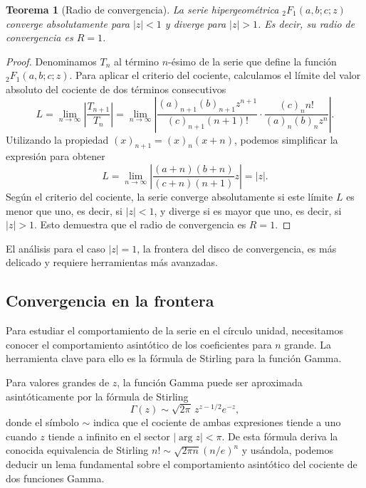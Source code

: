 \documentclass[12pt,a4paper]{book}
\newtheorem{theorem}{Teorema}
\begin{document}
\begin{theorem}[Radio de convergencia]
La serie hipergeométrica ${}_{2}F_{1}(a,b;c;z)$ converge absolutamente para $|z|<1$ y diverge para $|z|>1$. Es decir, su radio de convergencia es $R=1$.
\end{theorem}

\begin{proof}
Denominamos $T_n$ al término $n$-ésimo de la serie que define la función ${}_{2}F_{1}(a,b;c;z)$. Para aplicar el criterio del cociente, calculamos el límite del valor absoluto del cociente de dos términos consecutivos
\[
L = \lim_{n \to \infty} \left| \frac{T_{n+1}}{T_n} \right| = \lim_{n \to \infty} \left| \frac{(a)_{n+1} (b)_{n+1} z^{n+1}}{(c)_{n+1} (n+1)!} \cdot \frac{(c)_n n!}{(a)_n (b)_n z^n} \right|.
\]
Utilizando la propiedad $(x)_{n+1} = (x)_n (x+n)$, podemos simplificar la expresión para obtener
\[
L = \lim_{n \to \infty} \left| \frac{(a+n)(b+n)}{(c+n)(n+1)} z \right| = |z|.
\]
Según el criterio del cociente, la serie converge absolutamente si este límite $L$ es menor que uno, es decir, si $|z|<1$, y diverge si es mayor que uno, es decir, si $|z|>1$. Esto demuestra que el radio de convergencia es $R=1$.
\end{proof}

El análisis para el caso $|z|=1$, la frontera del disco de convergencia, es más delicado y requiere herramientas más avanzadas.

\subsection{Convergencia en la frontera}

Para estudiar el comportamiento de la serie en el círculo unidad, necesitamos conocer el comportamiento asintótico de los coeficientes para $n$ grande. La herramienta clave para ello es la fórmula de Stirling para la función Gamma.

Para valores grandes de $z$, la función Gamma puede ser aproximada asintóticamente por la fórmula de Stirling
\[ \Gamma(z) \sim \sqrt{2\pi} \, z^{z - 1/2} e^{-z},\]
donde el símbolo $\sim$ indica que el cociente de ambas expresiones tiende a uno cuando $z$ tiende a infinito en el sector $|\arg z| < \pi$.
De esta fórmula deriva la conocida equivalencia de Stirling $ n!\sim \sqrt {2\pi n}(n/e)^{n} $ y usándola, podemos deducir un lema fundamental sobre el comportamiento asintótico del cociente de dos funciones Gamma.
\end{document}
